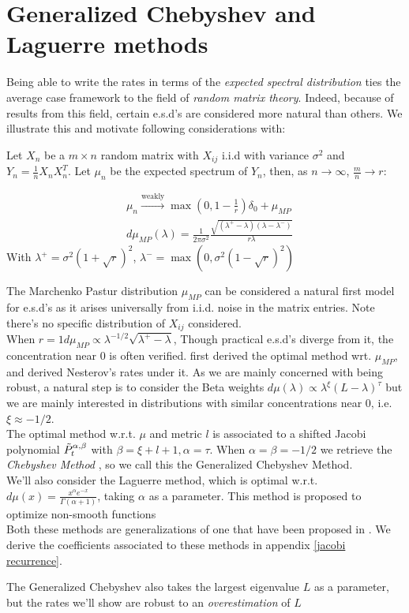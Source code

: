 \documentclass{article}
\begin{document}
\section{Generalized Chebyshev and Laguerre methods}
Being able to write the rates in terms of the \textit{expected spectral distribution} ties the average case framework to the field of \textit{random matrix theory}. Indeed, because of results from this field, certain e.s.d's are considered more natural than others. We illustrate this and motivate following considerations with:
\begin{prop}
Let $X_n$ be a $m\times n$ random matrix with $X_{ij}$ i.i.d with variance $\sigma^2$ and $Y_n=\frac{1}{n}X_nX_n^T$. Let $\mu_n$ be the expected spectrum of $Y_n$, then, as $n\rightarrow\infty$, $\frac{m}{n} \rightarrow r$:

\begin{align*}
&\mu_n\xrightarrow{\text{weakly}}{}\max(0,1-\frac{1}{r})\delta_0+\mu_{MP} \\
&d\mu_{MP}(\lambda)=\frac{1}{2\pi\sigma^2}\frac{\sqrt{(\lambda^+-\lambda)(\lambda-\lambda^-)}}{r\lambda}
\end{align*}
With $\lambda^+=\sigma^2(1+\sqrt{r})^2$, $\lambda^-=\max(0,\sigma^2(1-\sqrt{r})^2)$

\end{prop}
The Marchenko Pastur distribution $\mu_{MP}$ can be considered a natural first model for e.s.d's as it arises universally from i.i.d. noise in the matrix entries. Note there's no specific distribution of $X_{ij}$ considered. \\
When $r=1 d\mu_{MP}\propto \lambda^{-1/2}\sqrt{\lambda^+-\lambda}$, Though practical e.s.d's diverge from it, the concentration near $0$ is often verified.
\cite{pedregosa2020acceleration} first derived the optimal method wrt. $\mu_{MP}$, and \cite{paquette2020halting} derived Nesterov's rates under it. As we are mainly concerned with being robust, a natural step is to consider the Beta weights $d\mu(\lambda)\propto\lambda^\xi(L-\lambda)^\tau$ but we are mainly interested in distributions with similar concentrations near $0$, i.e. $\xi\approx -1/2$.\\
The optimal method w.r.t. $\mu$ and metric $l$ is associated to a shifted Jacobi polynomial $\Tilde{P}_t^{\alpha,\beta}$ with $\beta=\xi+l+1, \alpha=\tau$. When $\alpha=\beta=-1/2$ we retrieve the \textit{Chebyshev Method} \cite{hestenes1952methods}, so we call this the Generalized Chebyshev Method. \\
We'll also consider the Laguerre method, which is optimal w.r.t. $d\mu(x)=\frac{x^\alpha e^{-x}}{\Gamma(\alpha+1)}$, taking $\alpha$ as a parameter. This method is proposed to optimize non-smooth functions\\
Both these methods are generalizations of one that have been proposed in \cite{pedregosa2020acceleration}. We derive the coefficients associated to these methods in appendix \ref{jacobi recurrence}.\\
\begin{remark}
The Generalized Chebyshev also takes the largest eigenvalue $L$ as a parameter, but the rates we'll show are robust to an \textit{overestimation} of $L$
\end{remark}
\end{document}
